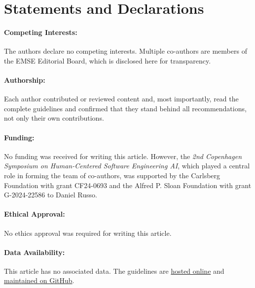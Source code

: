 \documentclass[smallextended]{svjour3}
\begin{document}
\section{Statements and Declarations}

\paragraph{Competing Interests:} The authors declare no competing interests. Multiple co-authors are members of the EMSE Editorial Board, which is disclosed here for transparency.

\paragraph{Authorship:} Each author contributed or reviewed content and, most importantly, read the complete guidelines and confirmed that they stand behind all recommendations, not only their own contributions.

\paragraph{Funding:} No funding was received for writing this article. However, the \emph{2nd Copenhagen Symposium on Human-Centered Software Engineering AI}, which played a central role in forming the team of co-authors, was supported by the Carlsberg Foundation with grant CF24-0693 and the Alfred P. Sloan Foundation with grant G-2024-22586 to Daniel Russo.

\paragraph{Ethical Approval:} No ethics approval was required for writing this article.

\paragraph{Data Availability:} This article has no associated data. The guidelines are \href{https://llm-guidelines.org/}{hosted online} and \href{https://github.com/se-uhd/llm-guidelines-website}{maintained on GitHub}.



\end{document}
